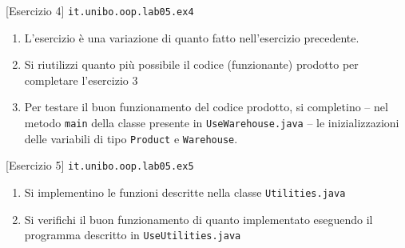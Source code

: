\documentclass[presentation]{beamer}
\begin{document}
\begin{frame}{[Esercizio 4] \texttt{it.unibo.oop.lab05.ex4}}
\begin{enumerate}
\item L'esercizio è una variazione di quanto fatto nell'esercizio precedente.
\item Si riutilizzi quanto più possibile il codice (funzionante) prodotto per completare l'esercizio 3
\item Per testare il buon funzionamento del codice prodotto, si completino -- nel metodo \texttt{main} della classe presente in \texttt{UseWarehouse.java} -- le inizializzazioni delle variabili di tipo \texttt{Product} e \texttt{Warehouse}.
\end{enumerate}
\end{frame}

\begin{frame}{[Esercizio 5] \texttt{it.unibo.oop.lab05.ex5}}
\begin{enumerate}
\item Si implementino le funzioni descritte nella classe \texttt{Utilities.java}
\item Si verifichi il buon funzionamento di quanto implementato eseguendo il programma descritto in \texttt{UseUtilities.java}
\end{enumerate}
\end{frame}
\end{document}
